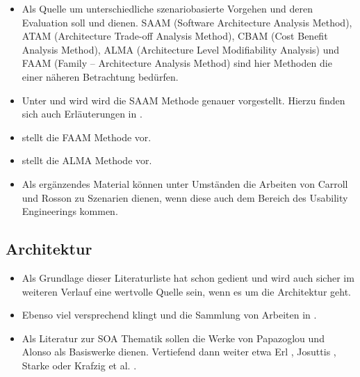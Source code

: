 \documentclass[12pt,headsepline,a4paper,bibtotoc,liststotoc,DIV12,BCOR12mm]{scrartcl}
\begin{document}
  \begin{itemize}
    \item Als Quelle um unterschiedliche szenariobasierte Vorgehen und deren Evaluation soll \citep{evaluating_software_architectures} und \citep{scenario_based_software_architecture_evaluation_methods} dienen. SAAM (Software Architecture Analysis Method), ATAM (Architecture Trade-off Analysis Method), CBAM (Cost Benefit Analysis Method), ALMA (Architecture Level Modifiability Analysis) und FAAM (Family – Architecture Analysis Method) sind hier Methoden die einer näheren Betrachtung bedürfen.
    \item Unter \citep{saam} und wird \citep{scenario_based_analysis_of_software_architecture} wird die SAAM Methode genauer vorgestellt. Hierzu finden sich auch Erläuterungen in \citep{handbuch_der_software_architektur}.
    \item \citep{faam} stellt die FAAM Methode vor.
    \item \citep{alma} stellt die ALMA Methode vor.
    \item Als ergänzendes Material können unter Umständen die Arbeiten von Carroll und Rosson zu Szenarien \citep{scenario_based_development,five_reasons_for_scenario_based_design} dienen, wenn diese auch dem Bereich des Usability Engineerings kommen.
  \end{itemize}


\subsection{Architektur} %
\label{sub:architektur}

  \begin{itemize}
    \item Als Grundlage dieser Literaturliste hat schon \citep{effektive_software_architekturen} gedient und wird auch sicher im weiteren Verlauf eine wertvolle Quelle sein, wenn es um die Architektur geht.
    \item Ebenso viel versprechend klingt \citep{software_architecture_in_practice} und die Sammlung von Arbeiten in \citep{handbuch_der_software_architektur}.
    \item Als Literatur zur SOA Thematik sollen die Werke von Papazoglou \citep{web_services_principles_and_technology} und Alonso \citep{web_services} als Basiswerke dienen. Vertiefend dann weiter etwa Erl \citep{soa}, Josuttis \citep{soa_in_practice}, Starke \citep{soa_expertenwissen} oder Krafzig et al. \citep{enterprise_soa}.
  \end{itemize}
\end{document}
